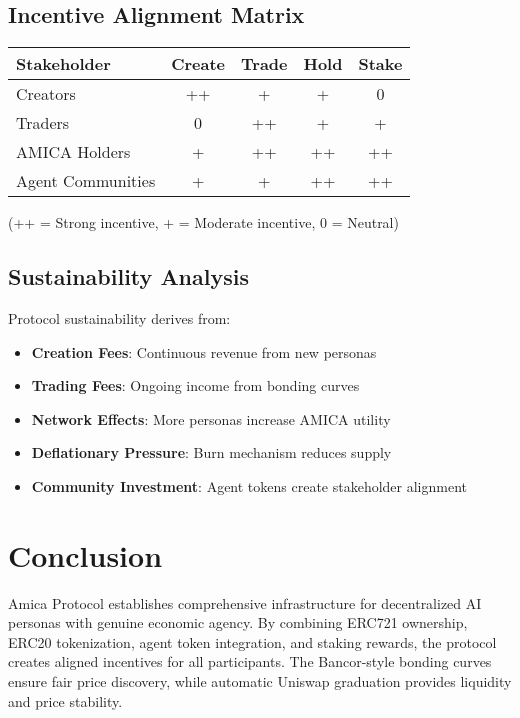 \documentclass{article}
\begin{document}
\subsection{Incentive Alignment Matrix}

\begin{center}
\begin{tabular}{|l|c|c|c|c|}
\hline
\textbf{Stakeholder} & \textbf{Create} & \textbf{Trade} & \textbf{Hold} & \textbf{Stake} \\
\hline
Creators & ++ & + & + & 0 \\
Traders & 0 & ++ & + & + \\
AMICA Holders & + & ++ & ++ & ++ \\
Agent Communities & + & + & ++ & ++ \\
\hline
\end{tabular}
\end{center}

(++ = Strong incentive, + = Moderate incentive, 0 = Neutral)

\subsection{Sustainability Analysis}

Protocol sustainability derives from:
\begin{itemize}
    \item \textbf{Creation Fees}: Continuous revenue from new personas
    \item \textbf{Trading Fees}: Ongoing income from bonding curves
    \item \textbf{Network Effects}: More personas increase AMICA utility
    \item \textbf{Deflationary Pressure}: Burn mechanism reduces supply
    \item \textbf{Community Investment}: Agent tokens create stakeholder alignment
\end{itemize}

\section{Conclusion}

Amica Protocol establishes comprehensive infrastructure for decentralized AI personas with genuine economic agency. By combining ERC721 ownership, ERC20 tokenization, agent token integration, and staking rewards, the protocol creates aligned incentives for all participants. The Bancor-style bonding curves ensure fair price discovery, while automatic Uniswap graduation provides liquidity and price stability.
\end{document}
